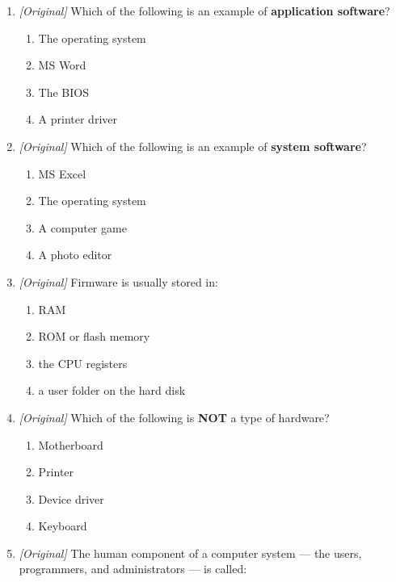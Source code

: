 \begin{enumerate}[label=\textbf{Q\arabic*.}, leftmargin=*]
\begin{enumerate}[label=\Alph*.]
    \item The application software
    \item The device driver
    \item The humanware
    \item The BIOS
  \end{enumerate}
\item \textit{[Original]} Which of the following is an example of
  \textbf{application software}?
  \begin{enumerate}[label=\Alph*.]
    \item The operating system
    \item MS Word
    \item The BIOS
    \item A printer driver
  \end{enumerate}
\item \textit{[Original]} Which of the following is an example of
  \textbf{system software}?
  \begin{enumerate}[label=\Alph*.]
    \item MS Excel
    \item The operating system
    \item A computer game
    \item A photo editor
  \end{enumerate}
\item \textit{[Original]} Firmware is usually stored in:
  \begin{enumerate}[label=\Alph*.]
    \item RAM
    \item ROM or flash memory
    \item the CPU registers
    \item a user folder on the hard disk
  \end{enumerate}
\item \textit{[Original]} Which of the following is \textbf{NOT} a type of
  hardware?
  \begin{enumerate}[label=\Alph*.]
    \item Motherboard
    \item Printer
    \item Device driver
    \item Keyboard
  \end{enumerate}
\item \textit{[Original]} The human component of a computer system --- the
  users, programmers, and administrators --- is called:
  \begin{enumerate}[label=\Alph*.]

\end{enumerate}
\end{enumerate}
